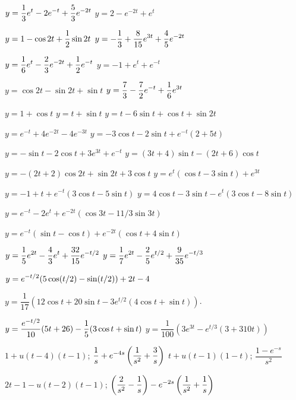   $y=\displaystyle{\frac{1}{3}e^t-2e^{-t}+\frac{5}{3}e^{-2t}}$
  $y=2-e^{-2t}+e^t$

  $y=\displaystyle{1-\cos2t+\frac{1}{2}\sin2t}$
  $y=\displaystyle{-\frac{1}{3}+\frac{8}{15}e^{3t}
+\frac{4}{5}e^{-2t}}$

  $y=\displaystyle{\frac{1}{6}e^t-\frac{2}{3}e^{-2t}+\frac{1}{2}e^{-t}}$
   $y=-1+e^t+e^{-t}$

  $y=\cos2t-\sin2t+\sin t$
  $y=\displaystyle{\frac{7}{3}-\frac{7}{2}e^{-t}
+\frac{1}{6}e^{3t}}$

  $y=1+\cos t$
  $y=t+\sin t$
  $y=t-6\sin t+\cos t+\sin2t$

  $y=e^{-t}+4e^{-2t}-4e^{-3t}$
  $y=-3\cos t-2\sin t+ e^{-t}(2+5t)$

  $y=-\sin t-2\cos t+3e^{3t}+e^{-t}$
  $y=(3t+4)\sin t-(2t+6)\cos t$

  $y=-(2t+2)\cos2t+\sin2t+3\cos t$
  $y=e^t(\cos t-3\sin t)+e^{3t}$

  $y=-1+t+e^{-t} (3\cos t-5\sin t)$
  $y=4\cos t-3\sin t-e^{t}(3\cos t-8\sin t)$

  $y=e^{-t}-2e^t+e^{-2t} (\cos 3t-{11/3}
\sin3t)$

  $y=e^{-t}(\sin t-\cos t)+e^{-2t}(\cos t
+4\sin t)$

  $y=\displaystyle{\frac{1}{5}e^{2t}-\frac{4}{3}e^t
+\frac{32}{15}e^{-t/2}}$
  $y=\displaystyle{\frac{1}{7}e^{2t}-\frac{2}{5}e^{t/2}+\frac{9}{35}e^{-t/3}}$

$y=\displaystyle{e^{-t/2}(5\cos(t/2)-\sin(t/2))+2t-4}$

$y=\dfrac{1}{17}\left(12\cos t+20\sin t-3e^{t/2}(4\cos t+\sin t
)\right)$.

 $y=\displaystyle{\frac{e^{-t/2}}{10}(5t+26)-\frac{1}{5}(3\cos
t+\sin t)}$
$y=\dfrac{1}{100}\left(3e^{3t}-e^{t/3}(3+310t)\right)$



 $ 1+u(t-4)(t-1)$;\;   $\displaystyle{\frac{1}{s}+e^{-4s}\left(\frac{1}{s^2}+\frac{3}{s}\right)}$
  $t+u(t-1)(1-t)$;\;
$\dfrac{1-e^{-s}}{s^2}$

 $2t-1-u(t-2)(t-1)$;\;   $\displaystyle{\left(\frac{2}{s^2}-\frac{1}{s}\right)-e^{-2s}\left(\frac{1}{s^2} +\frac{1}{s}\right)}$

